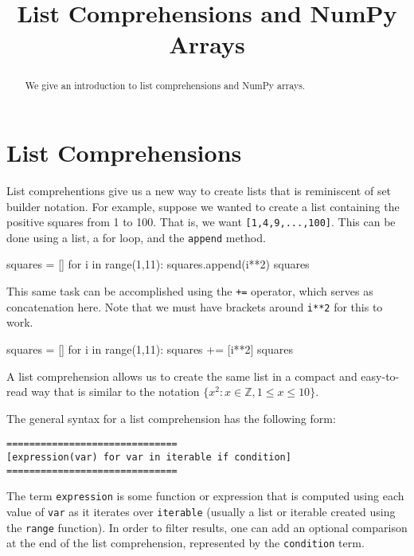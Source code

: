 \documentclass{ximera}
\title{List Comprehensions and NumPy Arrays}
\begin{document}
  
\begin{abstract}  
We give an introduction to list comprehensions and NumPy arrays.
\end{abstract}  
\maketitle

\section{List Comprehensions}

List comprehentions give us a new way to create lists that is reminiscent of set builder notation. For example, suppose we wanted to create a list containing the positive squares from 1 to 100. That is, we want \verb|[1,4,9,...,100]|. This can be done using a list, a for loop, and the \verb|append| method.

\begin{sageCell}
squares = []
for i in range(1,11):
        squares.append(i**2)
squares
\end{sageCell}

This same task can be accomplished using the \verb|+=| operator, which serves as concatenation here. Note that we must have brackets around \verb|i**2| for this to work.

\begin{sageCell}
squares = []
for i in range(1,11):
	squares += [i**2]
squares
\end{sageCell}

A list comprehension allows us to create the same list in a compact and easy-to-read way that is similar to the notation $\{x^2:x\in\mathbb{Z},1\leq x\leq 10\}$.

\begin{sageCell}
\end{sageCell}

The general syntax for a list comprehension has the following form:

\begin{verbatim}
==============================
[expression(var) for var in iterable if condition]
==============================
\end{verbatim}

The term \verb|expression| is some function or expression that is computed using each value of \verb|var| as it iterates over \verb|iterable| (usually a list or iterable created using the \verb|range| function). In order to filter results, one can add an optional comparison at the end of the list comprehension, represented by the \verb|condition| term.
\end{document}

